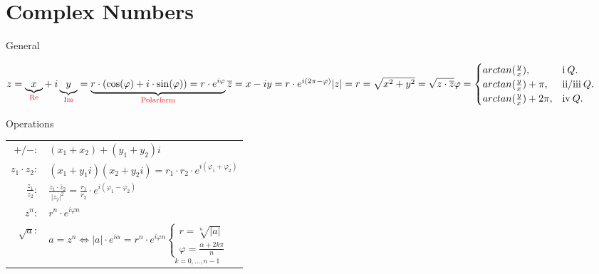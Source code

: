 \newcommand{\compconj}[1]{%
  \overline{#1}%
}
\newcommand{\RN}[1]{%
  \textup{\uppercase\expandafter{\romannumeral#1}}%
}
\newcommand*\circled[1]{\tikz[baseline=(char.base)]{
            \node[shape=circle,draw,inner sep=0.5pt] (char) {#1};}}
\newcommand{\ontoptext}[3][0pt]{%
	\begin{tabular}[b]{@{}c@{}}
	#2\\[#1]
	#3
	\end{tabular}}

\section{Complex Numbers}

\begin{mainbox}{General}

    $z = \underbrace{x}_\text{\textcolor{red}{Re}} +\:i\underbrace{y}_\text{\textcolor{red}{Im}} = \underbrace{r \cdot (\cos(\varphi) + i \cdot \sin(\varphi)) = r \cdot e^{i\varphi}}_\text{\textcolor{red}{Polarform}}\\
    \compconj{z} = x - iy = r \cdot e^{i(2\pi - \varphi)}\\
    |z| = r = \sqrt{x^{2} + y^{2}} = \sqrt{z \cdot \compconj{z}}\\
    \varphi = \begin{cases}
        arc tan(\frac{y}{x}), &\RN{1}\:Q.\\
        arc tan(\frac{y}{x}) + \pi, &\RN{2}/\RN{3}\:Q.\\
        arc tan(\frac{y}{x}) + 2\pi, &\RN{4}\:Q.\\
    \end{cases}$

\end{mainbox}
\begin{mainbox}{Operations}
    \begin{tabular}{rl}
        $+/-:$ & $(x_{1} + x_{2}) + (y_{1} + y_{2})i$ \\
        $z_1\cdot z_2:$ & $(x_{1} + y_{1}i)(x_{2} + y_{2}i) = r_{1}\cdot r_{2}\cdot e^{i(\varphi_{1} + \varphi_{2})}$ \\
        $\frac{z_{1}}{z_{2}}:$ & $\frac{z_1\cdot\compconj{z}_2}{|z_2|^2} = \frac{r_{1}}{r_{2}}\cdot e^{i(\varphi_{1} - \varphi_{2})}$ \\
        $z^n:$ & $r^n\cdot e^{i\varphi n}$ \\
        $\sqrt{a}:$ & $a = z^n  \Leftrightarrow |a|\cdot e^{i\alpha} = r^n\cdot e^{i\varphi n} \underset{k = 0,...,n-1}{\begin{cases}
            r = \sqrt[n]{|a|} \\
            \varphi = \frac{\alpha + 2k\pi}{n}
        \end{cases}}$
    \end{tabular}
\end{mainbox}

